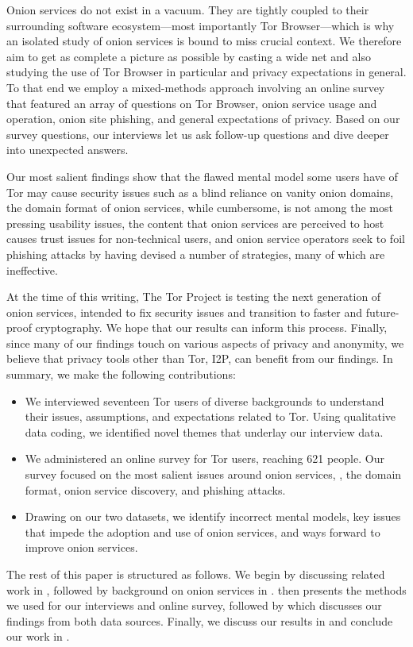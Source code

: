 Onion services do not exist in a vacuum.  They are tightly coupled to their
surrounding software ecosystem---most importantly Tor Browser---which is why an
isolated study of onion services is bound to miss crucial context.  We therefore
aim to get as complete a picture as possible by casting a wide net and also
studying the use of Tor Browser in particular and privacy expectations in
general.  To that end we employ a mixed-methods approach involving an online
survey that featured an array of questions on Tor Browser, onion service usage
and operation, onion site phishing, and general expectations of privacy.  Based
on our survey questions, our interviews let us ask follow-up questions and dive
deeper into unexpected answers.

Our most salient findings show that \first the flawed mental model some users
have of Tor may cause security issues such as a blind reliance on vanity onion
domains, \second the domain format of onion services, while cumbersome, is not
among the most pressing usability issues, \third the content that onion services
are perceived to host causes trust issues for non-technical users, and \fourth
onion service operators seek to foil phishing attacks by having devised a number
of strategies, many of which are ineffective.

At the time of this writing, The Tor Project is testing the next generation of
onion services, intended to fix security issues and transition to faster and
future-proof cryptography.  We hope that our results can inform this process.
Finally, since many of our findings touch on various aspects of privacy and
anonymity, we believe that privacy tools other than Tor, \eg I2P, can benefit
from our findings.  In summary, we make the following contributions:

\begin{itemize}
    \item We interviewed seventeen Tor users of diverse backgrounds to
        understand their issues, assumptions, and expectations related to Tor.
        Using qualitative data coding, we identified novel themes that underlay
        our interview data.

    \item We administered an online survey for Tor users, reaching 621 people.
        Our survey focused on the most salient issues around onion services,
        \eg, the domain format, onion service discovery, and phishing attacks.

    \item Drawing on our two datasets, we identify \first incorrect mental
        models, \second key issues that impede the adoption and use of onion
        services, and \third ways forward to improve onion services.
\end{itemize}

The rest of this paper is structured as follows.  We begin by discussing related
work in , followed by background on onion services in
.   then presents the methods we used for
our interviews and online survey, followed by  which discusses
our findings from both data sources.  Finally, we discuss our results in
 and conclude our work in .

